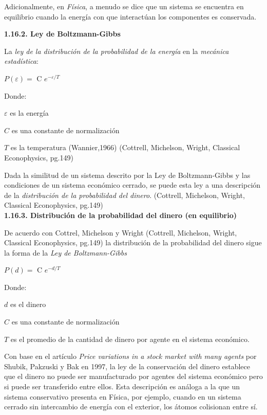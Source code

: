 Adicionalmente, en \textit{Física}, a menudo se dice que un sistema se encuentra en equilibrio cuando la energía con que interactúan los componentes es conservada. 
\newline

{
\noindent
\Large  \textbf{1.16.2. Ley de Boltzmann-Gibbs} 
}

La \textit{ley de la distribución de la probabilidad de la energía} en la \textit{mecánica estadística}:

\begin{center}
$\mathit{P(\varepsilon)} = $ C $e^{-\varepsilon/\mathit{T}}$ 
\end{center}
Donde:

$\varepsilon$ es la energía

$C$ es una constante de normalización

$\mathit{T}$ es la temperatura (Wannier,1966) (Cottrell, Michelson, Wright, Classical Econophysics, pg.149)

Dada la similitud de un sistema descrito por la Ley de Boltzmann-Gibbs y las condiciones de un sistema económico cerrado, se puede esta ley a una descripción de la \textit{distribución de la probabilidad del dinero}.
(Cottrell, Michelson, Wright, Classical Econophysics, pg.149)
\\

{
\noindent
\Large  \textbf{1.16.3. Distribución de la probabilidad del dinero (en equilibrio)} 
}


De acuerdo con Cottrel, Michelson y Wright (Cottrell, Michelson, Wright, Classical Econophysics, pg.149) la distribución de la probabilidad del dinero sigue la forma de la \textit{Ley de Boltzmann-Gibbs}


\begin{center}
$\mathit{P(d)} = $ C $e^{-d/\mathit{T}}$ 
\end{center}
Donde:

$d$ es el dinero

$C$ es una constante de normalización

$\mathit{T}$ es el promedio de la cantidad de dinero por agente en el sistema económico.

Con base en el artículo \textit{Price variations in a stock market with many agents} por Shubik, Pakzuski y Bak en 1997, la ley de la conservación del dinero establece que el dinero no puede ser manufacturado por agentes del sistema económico pero si puede ser transferido entre ellos. Esta descripción es análoga a la que un sistema conservativo presenta en Física, por ejemplo, cuando en un sistema cerrado sin intercambio de energía con el exterior, los átomos colisionan entre sí. 
\newpage

